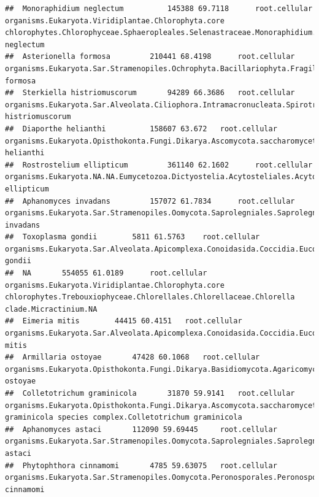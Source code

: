 \documentclass{article}\usepackage[]{graphicx}\usepackage[]{color}
\makeatletter
\newenvironment{kframe}{%
 \def\at@end@of@kframe{}%
 \ifinner\ifhmode%
  \def\at@end@of@kframe{\end{minipage}}%
  \begin{minipage}{\columnwidth}%
 \fi\fi%
 \def\FrameCommand##1{\hskip\@totalleftmargin \hskip-\fboxsep
 \colorbox{shadecolor}{##1}\hskip-\fboxsep
     \hskip-\linewidth \hskip-\@totalleftmargin \hskip\columnwidth}%
 \MakeFramed {\advance\hsize-\width
   \@totalleftmargin\z@ \linewidth\hsize
   \@setminipage}}%
 {\par\unskip\endMakeFramed%
 \at@end@of@kframe}
\newenvironment{knitrout}{}{} %
\makeatother
\begin{document}
\begin{knitrout}
\begin{kframe}
\begin{verbatim}
##  Monoraphidium neglectum 		 145388 69.7118 	 root.cellular organisms.Eukaryota.Viridiplantae.Chlorophyta.core chlorophytes.Chlorophyceae.Sphaeropleales.Selenastraceae.Monoraphidium.Monoraphidium neglectum
##  Asterionella formosa 		 210441 68.4198 	 root.cellular organisms.Eukaryota.Sar.Stramenopiles.Ochrophyta.Bacillariophyta.Fragilariophyceae.Fragilariophycidae.Fragilariales.Fragilariaceae.Asterionella.Asterionella formosa
##  Sterkiella histriomuscorum 		 94289 66.3686 	 root.cellular organisms.Eukaryota.Sar.Alveolata.Ciliophora.Intramacronucleata.Spirotrichea.Stichotrichia.NA.Oxytrichidae.Stylonychinae.Sterkiella.Sterkiella histriomuscorum
##  Diaporthe helianthi 		 158607 63.672 	 root.cellular organisms.Eukaryota.Opisthokonta.Fungi.Dikarya.Ascomycota.saccharomyceta.Pezizomycotina.leotiomyceta.sordariomyceta.Sordariomycetes.Sordariomycetidae.Diaporthales.Diaporthaceae.Diaporthe.Diaporthe helianthi
##  Rostrostelium ellipticum 		 361140 62.1602 	 root.cellular organisms.Eukaryota.NA.NA.Eumycetozoa.Dictyostelia.Acytosteliales.Acytosteliaceae.Rostrostelium.Rostrostelium ellipticum
##  Aphanomyces invadans 		 157072 61.7834 	 root.cellular organisms.Eukaryota.Sar.Stramenopiles.Oomycota.Saprolegniales.Saprolegniaceae.Aphanomyces.Aphanomyces invadans
##  Toxoplasma gondii 		 5811 61.5763 	 root.cellular organisms.Eukaryota.Sar.Alveolata.Apicomplexa.Conoidasida.Coccidia.Eucoccidiorida.Eimeriorina.Sarcocystidae.Toxoplasma.Toxoplasma gondii
##  NA 		 554055 61.0189 	 root.cellular organisms.Eukaryota.Viridiplantae.Chlorophyta.core chlorophytes.Trebouxiophyceae.Chlorellales.Chlorellaceae.Chlorella clade.Micractinium.NA
##  Eimeria mitis 		 44415 60.4151 	 root.cellular organisms.Eukaryota.Sar.Alveolata.Apicomplexa.Conoidasida.Coccidia.Eucoccidiorida.Eimeriorina.Eimeriidae.Eimeria.Eimeria mitis
##  Armillaria ostoyae 		 47428 60.1068 	 root.cellular organisms.Eukaryota.Opisthokonta.Fungi.Dikarya.Basidiomycota.Agaricomycotina.Agaricomycetes.Agaricomycetidae.Agaricales.Physalacriaceae.Armillaria.Armillaria ostoyae
##  Colletotrichum graminicola 		 31870 59.9141 	 root.cellular organisms.Eukaryota.Opisthokonta.Fungi.Dikarya.Ascomycota.saccharomyceta.Pezizomycotina.leotiomyceta.sordariomyceta.Sordariomycetes.Hypocreomycetidae.Glomerellales.NA.Colletotrichum.Colletotrichum graminicola species complex.Colletotrichum graminicola
##  Aphanomyces astaci 		 112090 59.69445 	 root.cellular organisms.Eukaryota.Sar.Stramenopiles.Oomycota.Saprolegniales.Saprolegniaceae.Aphanomyces.Aphanomyces astaci
##  Phytophthora cinnamomi 		 4785 59.63075 	 root.cellular organisms.Eukaryota.Sar.Stramenopiles.Oomycota.Peronosporales.Peronosporaceae.Phytophthora.Phytophthora cinnamomi

\end{verbatim}
\end{kframe}
\end{knitrout}
\end{document}
